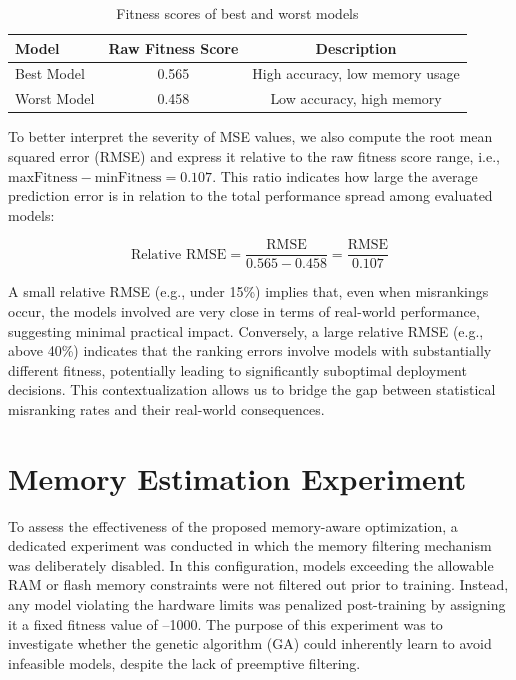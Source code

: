 \begin{table}[ht]
\centering
\caption{Fitness scores of best and worst models}
\begin{tabular}{lcc}
\toprule
Model & Raw Fitness Score & Description \\
\midrule
Best Model & 0.565 & High accuracy, low memory usage \\
Worst Model & 0.458 & Low accuracy, high memory \\
\bottomrule
\end{tabular}
\end{table}

To better interpret the severity of MSE values, we also compute the root mean squared error (RMSE) and express it relative to the raw fitness score range, i.e., \( \text{maxFitness} - \text{minFitness} = 0.107 \). This ratio indicates how large the average prediction error is in relation to the total performance spread among evaluated models:

\begin{equation}
\text{Relative RMSE} = \frac{\text{RMSE}}{0.565 - 0.458} = \frac{\text{RMSE}}{0.107}
\end{equation}

A small relative RMSE (e.g., under 15\%) implies that, even when misrankings occur, the models involved are very close in terms of real-world performance, suggesting minimal practical impact. Conversely, a large relative RMSE (e.g., above 40\%) indicates that the ranking errors involve models with substantially different fitness, potentially leading to significantly suboptimal deployment decisions. This contextualization allows us to bridge the gap between statistical misranking rates and their real-world consequences.




\section{Memory Estimation Experiment}
\label{sec:memory_estimation_experiment}
To assess the effectiveness of the proposed memory-aware optimization, a dedicated experiment was conducted in which the memory filtering mechanism was deliberately disabled. In this configuration, models exceeding the allowable RAM or flash memory constraints were not filtered out prior to training. Instead, any model violating the hardware limits was penalized post-training by assigning it a fixed fitness value of –1000. The purpose of this experiment was to investigate whether the genetic algorithm (GA) could inherently learn to avoid infeasible models, despite the lack of preemptive filtering.

